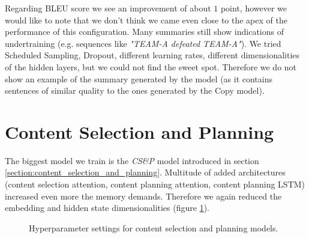 Regarding BLEU score we see an improvement of about $1$ point, however we would like to note that we don't think we came even close to the apex of the performance of this configuration. Many summaries still show indications of undertraining (e.g. sequences like \emph{"TEAM-A defeated TEAM-A"}). We tried Scheduled Sampling, Dropout, different learning rates, different dimensionalities of the hidden layers, but we could not find the sweet spot. Therefore we do not show an example of the summary generated by the model (as it contains sentences of similar quality to the ones generated by the Copy model).

\section{Content Selection and Planning} \label{section:experiments_csap}

The biggest model we train is the \emph{CS\&P} model introduced in section \ref{section:content_selection_and_planning}. Multitude of added architectures (content selection attention, content planning attention, content planning LSTM) increased even more the memory demands. Therefore we again reduced the embedding and hidden state dimensionalities (figure \ref{figure:hyperparameters_content_selection_and_planning}).

\begin{figure}[h]
    \caption{Hyperparameter settings for content selection and planning models.} \label{figure:hyperparameters_content_selection_and_planning}
\end{figure}


